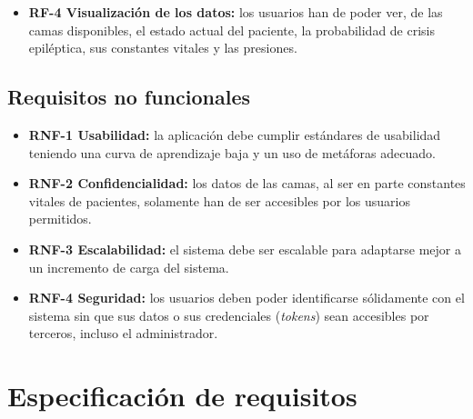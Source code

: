 \begin{itemize}
	\item \textbf{RF-4 Visualización de los datos:} los usuarios han de poder ver, de las camas disponibles, el estado actual del paciente, la probabilidad de crisis epiléptica, sus constantes vitales y las presiones. 
	
\end{itemize}

\subsection{Requisitos no funcionales}

\begin{itemize}
	\item \textbf{RNF-1 Usabilidad:} la aplicación debe cumplir estándares de usabilidad teniendo una curva de aprendizaje baja y un uso de metáforas adecuado.
	\item \textbf{RNF-2 Confidencialidad:} los datos de las camas, al ser en parte constantes vitales de pacientes, solamente han de ser accesibles por los usuarios permitidos.
	\item \textbf{RNF-3 Escalabilidad:} el sistema debe ser escalable para adaptarse mejor a un incremento de carga del sistema.
	\item \textbf{RNF-4 Seguridad:} los usuarios deben poder identificarse sólidamente con el sistema sin que sus datos o sus credenciales (\textit{tokens}) sean accesibles por terceros, incluso el administrador.
\end{itemize}


\section{Especificación de requisitos}


